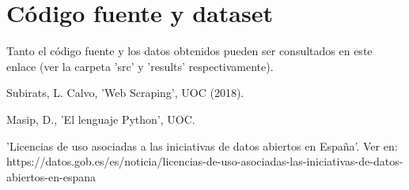 \documentclass[12pt]{article}
\begin{document}
\section*{Código fuente y dataset}
Tanto el código fuente y los datos obtenidos pueden ser consultados en este enlace (ver la carpeta 'src' y 'results' respectivamente).


\clearpage
\begin{thebibliography}{9}
	Subirats, L. Calvo, 'Web Scraping', UOC (2018).
	
	Masip, D., 'El lenguaje Python', UOC.
	
	'Licencias de uso asociadas a las iniciativas de datos abiertos en España'. Ver en: https://datos.gob.es/es/noticia/licencias-de-uso-asociadas-las-iniciativas-de-datos-abiertos-en-espana

	
	
\end{thebibliography}
\end{document}
